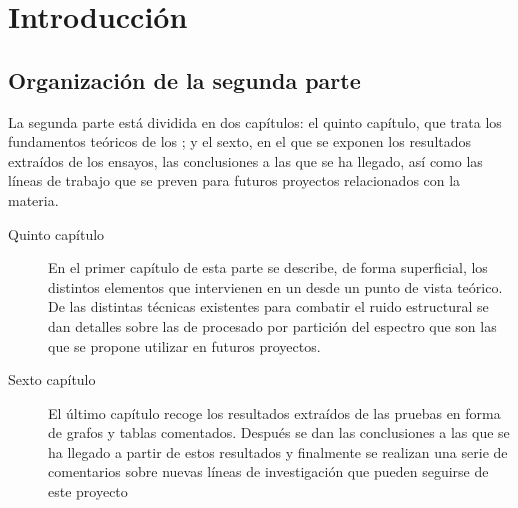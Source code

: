 \chapter*{Introducción}

\section*{Organización de la segunda parte}

La segunda parte está dividida en dos capítulos: el quinto capítulo, que
trata los fundamentos teóricos de los ; y el sexto, en el que se
exponen los resultados extraídos de los ensayos, las conclusiones a las que
se ha llegado, así como las líneas de trabajo que se preven para futuros
proyectos relacionados con la materia.

\begin{description}
    \item[Quinto capítulo] En el primer capítulo de esta parte se describe,
	de forma superficial, los distintos elementos que intervienen en un
	 desde un punto de vista teórico. De las distintas
	técnicas existentes para combatir el ruido estructural se dan
	detalles sobre las de procesado por partición del espectro que son
	las que se propone utilizar en futuros proyectos.
    \item[Sexto capítulo] El último capítulo recoge los resultados
	extraídos de las pruebas en forma de grafos y tablas comentados.
	Después se dan las conclusiones a las que se ha llegado a partir de
	estos resultados y finalmente se realizan una serie de comentarios
	sobre nuevas líneas de investigación que pueden seguirse de este
	proyecto
\end{description}
